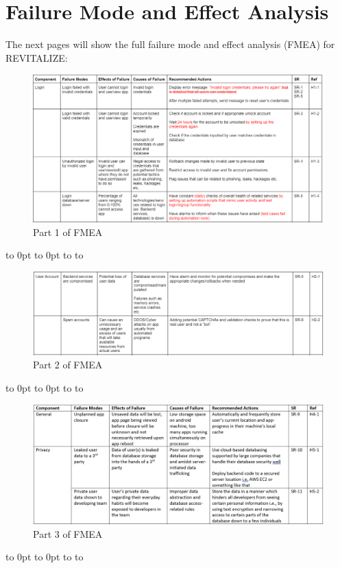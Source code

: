 \documentclass{article}
\def\fillandplacepagenumber{%
 \par\pagestyle{empty}%
 \vbox to 0pt{\vss}\vfill
 \vbox to 0pt{\baselineskip0pt
   \hbox to\linewidth{\hss}%
   \baselineskip\footskip
   \hbox to\linewidth{%
     \hfil\thepage\hfil}\vss}}
\begin{document}
\section{Failure Mode and Effect Analysis}
The next pages will show the full failure mode and effect analysis (FMEA) for REVITALIZE:
\begin{landscape}
	\begin{figure}[ht]
		\centering
		\includegraphics[angle=360, scale=0.8]{FMEA_1.png}
		\caption{Part 1 of FMEA}
	\end{figure}
	\fillandplacepagenumber
\end{landscape}
\begin{landscape}
	\begin{figure}[ht]
		\centering
		\includegraphics[angle=360, scale=1.15]{FMEA_2.png}
		\caption{Part 2 of FMEA}
	\end{figure}
	\fillandplacepagenumber
\end{landscape}
\begin{landscape}
	\begin{figure}[ht]
		\centering
		\includegraphics[angle=360, scale=0.85]{FMEA_3.png}
		\caption{Part 3 of FMEA}
	\end{figure}
	\fillandplacepagenumber
\end{landscape}
\end{document}
